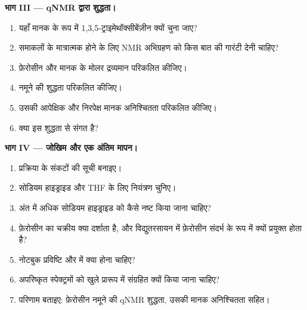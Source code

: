 \begin{problem}
\medskip\noindent\textbf{भाग III --- qNMR द्वारा शुद्धता।}
\begin{enumerate}[resume]
  \item यहाँ मानक के रूप में 1,3,5-ट्राइमेथॉक्सीबेंज़ीन क्यों चुना जाए?
  \item समाकलों के मात्रात्मक होने के लिए NMR अभिग्रहण को किस बात की गारंटी देनी चाहिए?
  \item फ़ेरोसीन और मानक के मोलर द्रव्यमान परिकलित कीजिए।
  \item नमूने की शुद्धता परिकलित कीजिए।
  \item उसकी आपेक्षिक और निरपेक्ष मानक अनिश्चितता परिकलित कीजिए।
  \item क्या  इस शुद्धता से संगत है?
\end{enumerate}

\medskip\noindent\textbf{भाग IV --- जोखिम और एक अंतिम मापन।}
\begin{enumerate}[resume]
  \item प्रक्रिया के संकटों की सूची बनाइए।
  \item सोडियम हाइड्राइड और THF के लिए नियंत्रण चुनिए।
  \item अंत में अधिक सोडियम हाइड्राइड को कैसे नष्ट किया जाना चाहिए?
  \item फ़ेरोसीन का चक्रीय  क्या दर्शाता है, और विद्युतरसायन में फ़ेरोसीन
        संदर्भ के रूप में क्यों प्रयुक्त होता है?
  \item नोटबुक प्रविष्टि और  में क्या होना चाहिए?
  \item अपरिष्कृत स्पेक्ट्रमों को खुले प्रारूप में संग्रहित क्यों किया जाना चाहिए?
  \item परिणाम बताइए: फ़ेरोसीन नमूने की qNMR शुद्धता, उसकी मानक
        अनिश्चितता सहित।
\end{enumerate}
\end{problem}

